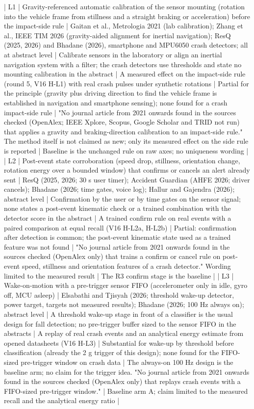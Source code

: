 | L1 | Gravity-referenced automatic calibration of the sensor mounting (rotation into the vehicle frame from stillness and a straight braking or acceleration) before the impact-side rule | Gaitan et al., Metrologia 2021 (lab calibration); Zhang et al., IEEE TIM 2026 (gravity-aided alignment for inertial navigation); ResQ (2025, 2026) and Bhadane (2026), smartphone and MPU6050 crash detectors; all at abstract level | Calibrate sensors in the laboratory or align an inertial navigation system with a filter; the crash detectors use thresholds and state no mounting calibration in the abstract | A measured effect on the impact-side rule (round 5, V16 H-L1) with real crash pulses under synthetic rotations | Partial for the principle (gravity plus driving direction to find the vehicle frame is established in navigation and smartphone sensing); none found for a crash impact-side rule | "No journal article from 2021 onwards found in the sources checked (OpenAlex; IEEE Xplore, Scopus, Google Scholar and TRID not run) that applies a gravity and braking-direction calibration to an impact-side rule." The method itself is not claimed as new; only its measured effect on the side rule is reported | Baseline is the unchanged rule on raw axes; no uniqueness wording |
| L2 | Post-event state corroboration (speed drop, stillness, orientation change, rotation energy over a bounded window) that confirms or cancels an alert already sent | ResQ (2025, 2026; 30 s user timer); Accident Guardian (AHFE 2026; driver cancels); Bhadane (2026; time gates, voice log); Hallur and Gajendra (2026); abstract level | Confirmation by the user or by time gates on the sensor signal; none states a post-event kinematic check or a trained combination with the detector score in the abstract | A trained confirm rule on real events with a paired comparison at equal recall (V16 H-L2a, H-L2b) | Partial: confirmation after detection is common; the post-event kinematic state used as a trained feature was not found | "No journal article from 2021 onwards found in the sources checked (OpenAlex only) that trains a confirm or cancel rule on post-event speed, stillness and orientation features of a crash detector." Wording limited to the measured result | The R3 confirm stage is the baseline |
| L3 | Wake-on-motion with a pre-trigger sensor FIFO (accelerometer only in idle, gyro off, MCU asleep) | Elsabathi and Tjisyah (2026; threshold wake-up detector, power target, targets not measured results); Bhadane (2026; 100 Hz always on); abstract level | A threshold wake-up stage in front of a classifier is the usual design for fall detection; no pre-trigger buffer sized to the sensor FIFO in the abstracts | A replay of real crash events and an analytical energy estimate from opened datasheets (V16 H-L3) | Substantial for wake-up by threshold before classification (already the 2 g trigger of this design); none found for the FIFO-sized pre-trigger window on crash data | The always-on 100 Hz design is the baseline arm; no claim for the trigger idea. "No journal article from 2021 onwards found in the sources checked (OpenAlex only) that replays crash events with a FIFO-sized pre-trigger window." | Baseline arm A; claim limited to the measured recall and the analytical energy ratio |

